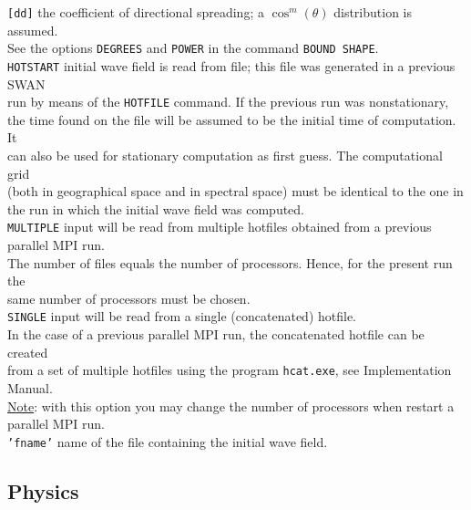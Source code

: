\documentclass[12pt]{book}
\begin{document}
\begin{tabbing}
{\tt [dd]}      \> the coefficient of directional spreading; a $\cos^m (\theta)$ distribution is assumed.\+\\
                   See the options {\tt DEGREES} and {\tt POWER} in the command {\tt BOUND SHAPE}.\-\\
{\tt HOTSTART}  \> initial wave field is read from file; this file was generated in a previous SWAN\+\\
                   run by means of the {\tt HOTFILE} command. If the previous run was nonstationary,\\
                   the time found on the file will be assumed to be the initial time of computation. It\\
                   can also be used for stationary computation as first guess. The computational grid\\
                   (both in geographical space and in spectral space) must be identical to the one in\\
                   the run in which the initial wave field was computed.\-\\
{\tt MULTIPLE}  \> input will be read from multiple hotfiles obtained from a previous parallel MPI run.\+\\
                   The number of files equals the number of processors. Hence, for the present run the\\
                   same number of processors must be chosen.\-\\
{\tt SINGLE}    \> input will be read from a single (concatenated) hotfile.\+\\
                   In the case of a previous parallel MPI run, the concatenated hotfile can be created\\
                   from a set of multiple hotfiles using the program {\tt hcat.exe}, see Implementation\\
                   Manual.\\
                   \underline{Note}: with this option you may change the number of processors when restart a\\
                   parallel MPI run.\-\\
{\tt {'fname'}} \> name of the file containing the initial wave field.\\
\end{tabbing}

\subsection{Physics}
\end{document}
